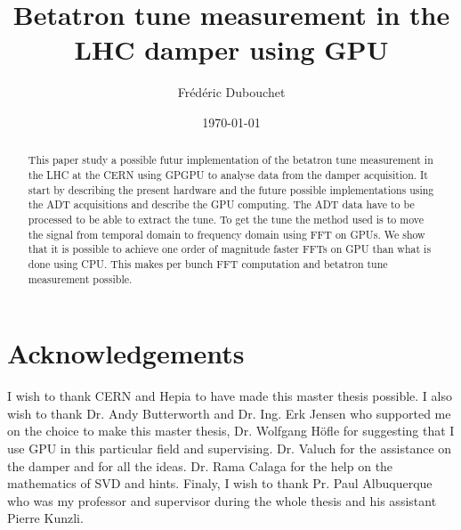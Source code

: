 \documentclass[a4paper]{report}
\title{Betatron tune measurement in the LHC damper using GPU}
\author{Fr{\'e}d{\'e}ric Dubouchet}
\date{\today}
\begin{document}
\maketitle

\begin{abstract}
	This paper study a possible futur implementation of the betatron tune measurement in the \gls{LHC} at the \gls{CERN} using \gls{GPGPU} to analyse data from the \gls{damper} acquisition. It start by describing the present hardware and the future possible implementations using the \gls{ADT} acquisitions and describe the \gls{GPU} computing. The \gls{ADT} data have to be processed to be able to extract the \gls{tune}. To get the tune the method used is to move the signal from temporal domain to frequency domain using \gls{FFT} on \glspl{GPU}. We show that it is possible to achieve one order of magnitude faster \glspl{FFT} on \gls{GPU} than what is done using \gls{CPU}. This makes per \gls{bunch} \gls{FFT} computation and betatron tune measurement possible.  
\end{abstract}

\chapter*{Acknowledgements}
	I wish to thank \gls{CERN} and \gls{Hepia} to have made this master thesis possible. I also wish to thank Dr. Andy Butterworth and Dr. Ing. Erk Jensen who supported me on the choice to make this master thesis, Dr. Wolfgang H{\"o}f\/le for suggesting that I use GPU in this particular field and supervising. Dr. Valuch for the assistance on the damper and for all the ideas. Dr. Rama Calaga for the help on the mathematics of \gls{SVD} and hints. Finaly, I wish to thank Pr. Paul Albuquerque who was my professor and supervisor during the whole thesis and his assistant Pierre Kunzli.

\tableofcontents
\listoffigures
\listoftables








\printglossaries


\end{document}
